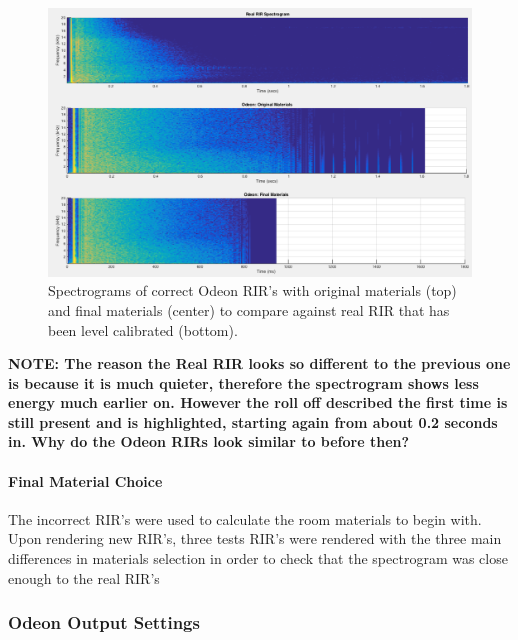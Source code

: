 \documentclass[../../main.tex]{subfiles}
\begin{document}
			\begin{figure}[H]
				\center\includegraphics[scale = 0.4]{Sections/Implementation/Odeon/images/MaterialCompare/NewMaterials/newOdeonComparison.png}
				\caption{Spectrograms of correct Odeon \ac{RIR}'s with original materials (top) and final materials (center) to compare against real RIR that has been level calibrated (bottom).}
				\label{compareCorrect}
			\end{figure}

			\textbf{NOTE: The reason the Real RIR looks so different to the previous one is because it is much quieter, therefore the spectrogram shows less energy much earlier on. However the roll off described the first time is still present and is highlighted, starting again from about 0.2 seconds in. Why do the Odeon RIRs look similar to before then?}




		\paragraph{Final Material Choice}

			

			The incorrect \ac{RIR}'s were used to calculate the room materials to begin with. Upon rendering new \ac{RIR}'s, three tests \ac{RIR}'s were rendered with the three main differences in materials selection in order to check that the spectrogram was close enough to the real \ac{RIR}'s

		\subsubsection{Odeon Output Settings}
\end{document}
